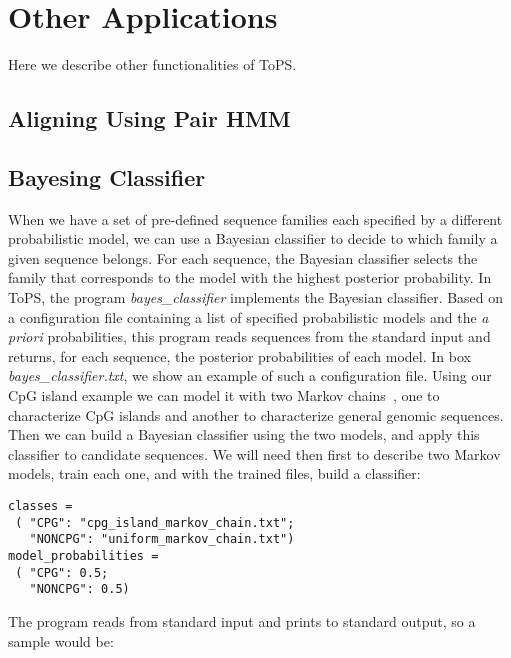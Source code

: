 \chapter{Other Applications}

Here we describe other functionalities of ToPS. 
\section{Aligning Using Pair HMM}

\section{Bayesing Classifier}


When we have a set of pre-defined sequence families each specified by a different probabilistic model, we can use a Bayesian classifier to decide to which family a given sequence belongs.  For each sequence, the Bayesian classifier selects the family that corresponds to the model with the highest posterior probability. In ToPS, the program \textit{bayes\_classifier} implements the Bayesian classifier. Based on a configuration file containing a list of specified probabilistic models and the {\it a priori} probabilities,  this program reads sequences from the standard input and returns, for each sequence, the posterior probabilities of each model. In box \textit{bayes\_classifier.txt}, we show an example of such a configuration file. Using our CpG island example we can model it with two Markov chains~\cite{Durbin1998}, one to characterize CpG islands and another to characterize general genomic sequences. Then we can build a Bayesian classifier using the two models, and apply this classifier to candidate sequences. We will need then first to describe two Markov models, train each one, and with the trained files, build a classifier:

\vspace{1em}
\begin{Verbatim}[frame=single,  label={bayes\_classifier.txt}]
classes =
 ( "CPG": "cpg_island_markov_chain.txt";
   "NONCPG": "uniform_markov_chain.txt")
model_probabilities =
 ( "CPG": 0.5;
   "NONCPG": 0.5)
\end{Verbatim}

\vspace{1em}

The program reads from standard input and prints to standard output, so a sample would be:

